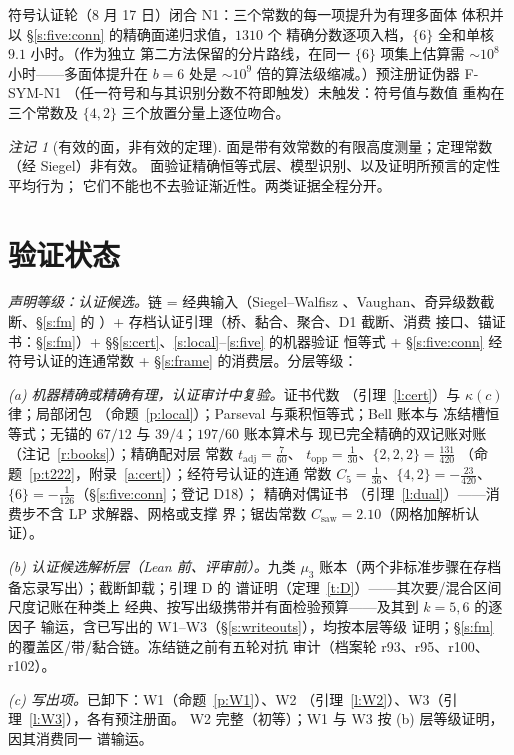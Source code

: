\documentclass[11pt]{article}
\numberwithin{equation}{section}
\theoremstyle{definition}
\theoremstyle{remark}
\newtheorem{remark}[theorem]{注记}
\begin{document}
符号认证轮（8 月 17 日）闭合 N1：三个常数的每一项提升为有理多面体
体积并以 \S\ref{s:five:conn} 的精确面递归求值，$1310$ 个
精确分数逐项入档，$\{6\}$ 全和单核 $9.1$ 小时。（作为独立
第二方法保留的分片路线，在同一 $\{6\}$ 项集上估算需
$\sim10^{8}$ 小时——多面体提升在 $b=6$ 处是
$\sim10^{9}$ 倍的算法级缩减。）预注册证伪器 F-SYM-N1
（任一符号和与其识别分数不符即触发）未触发：符号值与数值
重构在三个常数及 $\{4,2\}$ 三个放置分量上逐位吻合。

\begin{remark}[有效的面，非有效的定理]
面是带有效常数的有限高度测量；定理常数（经 Siegel）非有效。
面验证精确恒等式层、模型识别、以及证明所预言的定性平均行为；
它们不能也不去验证渐近性。两类证据全程分开。
\end{remark}

\section{验证状态}\label{s:verif}

\emph{声明等级：认证候选。}链 = 经典输入（Siegel--Walfisz
\cite{Dav,IK}、Vaughan、奇异级数截断、\S\ref{s:fm} 的
\cite{MRT}）+ 存档认证引理（桥、黏合、聚合、D1 截断、消费
接口、锚证书：\S\ref{s:fm}）+
\S\S\ref{s:cert}、\ref{s:local}--\ref{s:five} 的机器验证
恒等式 + \S\ref{s:five:conn} 经符号认证的连通常数 +
\S\ref{s:frame} 的消费层。分层等级：

\emph{(a) 机器精确或精确有理，认证审计中复验。}证书代数
（引理~\ref{l:cert}）与 $\kappa(c)$ 律；局部闭包
（命题~\ref{p:local}）；Parseval 与乘积恒等式；Bell 账本与
冻结槽恒等式；无锚的 $67/12$ 与 $39/4$；$197/60$ 账本算术与
现已完全精确的双记账对账（注记~\ref{r:books}）；精确配对层
常数 $t_{\mathrm{adj}}=\tfrac7{60}$、
$t_{\mathrm{opp}}=\tfrac1{30}$、$\{2,2,2\}=\tfrac{131}{420}$
（命题~\ref{p:t222}，附录~\ref{a:cert}）；经符号认证的连通
常数 $C_5=\tfrac1{36}$、$\{4,2\}=-\tfrac{23}{420}$、
$\{6\}=-\tfrac1{126}$（\S\ref{s:five:conn}；登记 D18）；
精确对偶证书
（引理~\ref{l:dual}）——消费步不含 LP 求解器、网格或支撑
界；锯齿常数 $C_{\mathrm{saw}}=2.10$（网格加解析认证）。

\emph{(b) 认证候选解析层（Lean 前、评审前）。}九类 $\mu_3$
账本（两个非标准步骤在存档备忘录写出）；截断卸载；引理 D 的
谱证明（定理~\ref{t:D}）——其次要/混合区间尺度记账在种类上
经典、按写出级携带并有面检验预算——及其到 $k=5,6$ 的逐因子
输运，含已写出的 W1--W3（\S\ref{s:writeouts}），均按本层等级
证明；\S\ref{s:fm} 的覆盖区/带/黏合链。冻结链之前有五轮对抗
审计（档案轮 r93、r95、r100、r102）。

\emph{(c) 写出项。}已卸下：W1（命题~\ref{p:W1}）、W2
（引理~\ref{l:W2}）、W3（引理~\ref{l:W3}），各有预注册面。
W2 完整（初等）；W1 与 W3 按 (b) 层等级证明，因其消费同一
谱输运。
\end{document}

